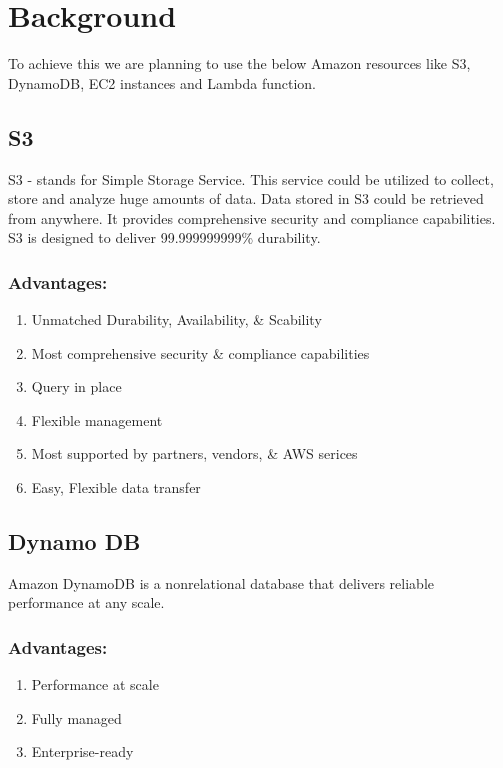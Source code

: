 \chapter{Background}\label{chap:background}

To achieve this we are planning to use the below Amazon resources like  S3, DynamoDB, EC2 instances and Lambda function. 

\section{S3}

S3 - stands for Simple Storage Service. This service could be utilized to collect, store and analyze huge amounts of data. Data stored in S3 could be retrieved from anywhere. It provides comprehensive security and compliance capabilities. S3 is designed to deliver 99.999999999\% durability.\\

\subsection{Advantages:}\cite{S3documentation}
\begin{enumerate}
	\item Unmatched Durability, Availability, \& Scability
	\item Most comprehensive security \& compliance capabilities
	\item Query in place
	\item Flexible management
	\item Most supported by partners, vendors, \& AWS serices
	\item Easy, Flexible data transfer
\end{enumerate}

\section{Dynamo DB} \cite{DynamoDBDoc}
Amazon DynamoDB is a nonrelational database that delivers reliable performance at any scale.

\subsection{Advantages:}
\begin{enumerate}
	\item Performance at scale
	\item Fully managed
	\item Enterprise-ready
\end{enumerate}


